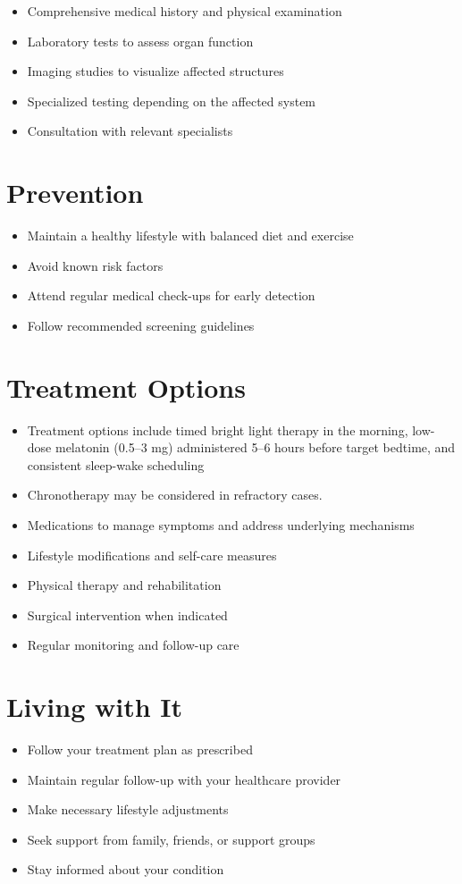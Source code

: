 \begin{itemize}[noitemsep]
  \item Comprehensive medical history and physical examination
  \item Laboratory tests to assess organ function
  \item Imaging studies to visualize affected structures
  \item Specialized testing depending on the affected system
  \item Consultation with relevant specialists
\end{itemize}
\section{Prevention}
\begin{itemize}[noitemsep]
  \item Maintain a healthy lifestyle with balanced diet and exercise
  \item Avoid known risk factors
  \item Attend regular medical check-ups for early detection
  \item Follow recommended screening guidelines
\end{itemize}
\section{Treatment Options}
\begin{itemize}[noitemsep]
  \item Treatment options include timed bright light therapy in the morning, low-dose melatonin (0.5--3 mg) administered 5--6 hours before target bedtime, and consistent sleep-wake scheduling
  \item Chronotherapy may be considered in refractory cases.
  \item Medications to manage symptoms and address underlying mechanisms
  \item Lifestyle modifications and self-care measures
  \item Physical therapy and rehabilitation
  \item Surgical intervention when indicated
  \item Regular monitoring and follow-up care
\end{itemize}
\section{Living with It}
\begin{itemize}[noitemsep]
  \item Follow your treatment plan as prescribed
  \item Maintain regular follow-up with your healthcare provider
  \item Make necessary lifestyle adjustments
  \item Seek support from family, friends, or support groups
  \item Stay informed about your condition
\end{itemize}
